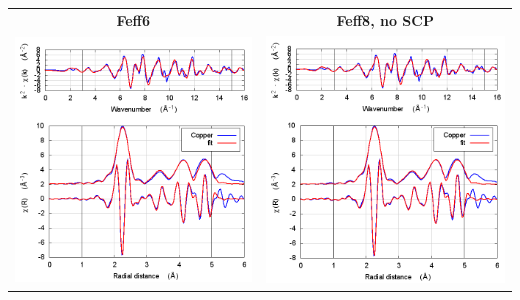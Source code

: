 \documentclass[11pt]{article}
\begin{document}
\begin{center}
  \begin{tabular}{cc}
    \textbf{Feff6} & \textbf{Feff8, no SCP} \\
    \includegraphics[width=.45\linewidth]{Copper/scf/fit_feff6.png} & 
    \includegraphics[width=.45\linewidth]{Copper/scf/fit_noSCF.png} \\
  \end{tabular}
\end{center}
\end{document}
